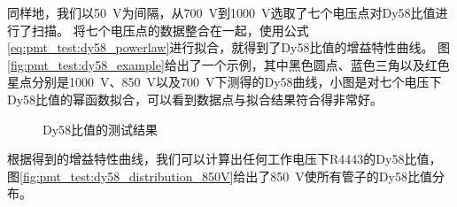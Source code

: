 同样地，我们以\SI{50}{V}为间隔，从\SI{700}{V}到\SI{1000}{V}选取了七个电压点对Dy58比值进行了扫描。
将七个电压点的数据整合在一起，使用公式\ref{eq:pmt_test:dy58_powerlaw}进行拟合，就得到了Dy58比值的增益特性曲线。
图\ref{fig:pmt_test:dy58_example}给出了一个示例，其中黑色圆点、蓝色三角以及红色星点分别是\SI{1000}{V}、\SI{850}{V}以及\SI{700}{V}下测得的Dy58曲线，小图是对七个电压下Dy58比值的幂函数拟合，可以看到数据点与拟合结果符合得非常好。
\begin{figure}[htbp]
	\centering
	\caption{Dy58比值的测试结果}
	\label{fig:pmt_test:dy58_results}
\end{figure}
根据得到的增益特性曲线，我们可以计算出任何工作电压下R4443的Dy58比值，图\ref{fig:pmt_test:dy58_distribution_850V}给出了\SI{850}{V}使所有管子的Dy58比值分布。

